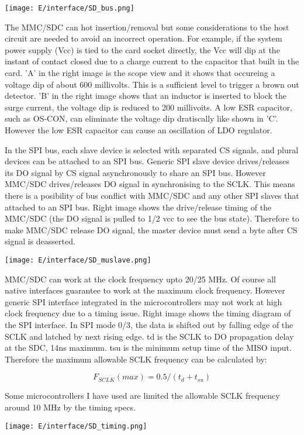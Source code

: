 \bigskip
\noindent\texttt{[image: E/interface/SD\_bus.png]}
\bigskip

The MMC/SDC can hot insertion/removal but some considerations to the host
circuit are needed to avoid an incorrect operation. For example, if the system
power supply (Vcc) is tied to the card socket directly, the Vcc will dip at the
instant of contact closed due to a charge current to the capacitor that built in
the card. 'A' in the right image is the scope view and it shows that occureing a
voltage dip of about 600 millivolts. This is a sufficient level to trigger a
brown out detector. 'B' in the right image shows that an inductor is inserted to
block the surge current, the voltage dip is reduced to 200 millivoits. A low ESR
capacitor, such as OS-CON, can eliminate the voltage dip dratiscally like shown
in 'C'. However the low ESR capacitor can cause an oscillation of LDO regulator.


In the SPI bus, each slave device is selected with separated CS signals, and
plural devices can be attached to an SPI bus. Generic SPI slave device
drives/releases its DO signal by CS signal asynchronously to share an SPI bus.
However MMC/SDC drives/releases DO signal in synchronising to the SCLK. This
means there is a posibility of bus conflict with MMC/SDC and any other SPI
slaves that attached to an SPI bus. Right image shows the drive/release timing
of the MMC/SDC (the DO signal is pulled to 1/2 vcc to see the bus state).
Therefore to make MMC/SDC release DO signal, the master device must send a byte
after CS signal is deasserted.

\bigskip
\noindent\texttt{[image: E/interface/SD\_muslave.png]}
\bigskip


MMC/SDC can work at the clock frequency upto 20/25 MHz. Of course all native
interfaces guarantee to work at the maximum clock frequency. However generic SPI
interface integrated in the microcontrollers may not work at high clock
frequency due to a timing issue. Right image shows the timing diagram of the SPI
interface. In SPI mode 0/3, the data is shifted out by falling edge of the SCLK
and latched by next rising edge. td is the SCLK to DO propagation delay at the
SDC, 14ns maximum. tsu is the minimum setup time of the MISO input. Therefore
the maximum allowable SCLK frequency can be calculated by:

\begin{equation}
F_{SCLK}(max) = 0.5 / (t_{d} + t_{su})
\end{equation}

Some microcontrollers I have used are limited the allowable SCLK frequency
around 10 MHz by the timing specs.

\bigskip
\noindent\texttt{[image: E/interface/SD\_timing.png]}
\bigskip


\secup
